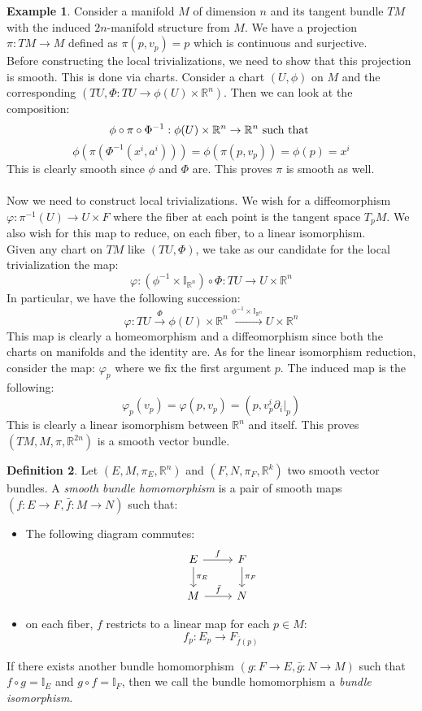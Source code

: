 \documentclass[12pt,a4paper]{report}
\theoremstyle{definition}
\newtheorem{Def}{Definition}[chapter]
\theoremstyle{Theorem}
\theoremstyle{definition}
\newtheorem{Ex}[Def]{Example}
\theoremstyle{definition}
\begin{document}
	\begin{Ex}
		Consider a manifold $M$ of dimension $n$ and its tangent bundle $TM$ with the induced $2n$-manifold structure from $M$. We have a projection $\pi:TM\rightarrow M$ defined as $\pi(p,v_p)=p$ which is continuous and surjective. 
		\\
		Before constructing the local trivializations, we need to show that this projection is smooth. This is done via charts. Consider a chart $(U,\phi)$ on $M$ and the corresponding $(TU,\Phi:TU\rightarrow \phi(U)\times \mathbb{R}^n)$. Then we can look at the composition:
		$$\phi\circ \pi\circ \Phi^{-1}:\phi(U)\times \mathbb{R}^n\rightarrow \mathbb{R}^n \hbox{ such that }$$ 
		$$\phi(\pi(\Phi^{-1}(x^i,a^i)))=\phi(\pi(p,v_p))=\phi(p)=x^i$$
		This is clearly smooth since $\phi$ and $\Phi$ are. This proves $\pi$ is smooth as well.\\
		\\
		Now we need to construct local trivializations. We wish for a diffeomorphism $\varphi:\pi^{-1}(U)\rightarrow U\times F$ where the fiber at each point is the tangent space $T_pM$. We also wish for this map to reduce, on each fiber, to a linear isomorphism.\\
		Given any chart on $TM$ like $(TU,\Phi)$, we take as our candidate for the local trivialization the map: 
		$$\varphi:(\phi^{-1}\times \mathbb{I}_{\mathbb{R}^n})\circ \Phi:TU\rightarrow U\times \mathbb{R}^n$$
		In particular, we have the following succession:
		$$\varphi:TU\xrightarrow{\text{$\Phi$}} \phi(U)\times \mathbb{R}^n\xrightarrow{\text{$\phi^{-1}\times \mathbb{I}_{\mathbb{R}^n}$}}U\times \mathbb{R}^n$$
		This map is clearly a homeomorphism and a diffeomorphism since both the charts on manifolds and the identity are. As for the linear isomorphism reduction, consider the map:
		$\varphi_p$ where we fix the first argument $p$. The induced map is the following:
		$$\varphi_p(v_p)=\varphi(p,v_p)=(p,v^i_p\partial_i|_p)$$
		This is clearly a linear isomorphism between $\mathbb{R}^n$ and itself. This proves $(TM,M,\pi,\mathbb{R}^{2n})$ is a smooth vector bundle.
	\end{Ex}
	\begin{Def}
		Let $(E,M,\pi_E,\mathbb{R}^n)$ and $(F,N,\pi_F,\mathbb{R}^k)$ two smooth vector bundles. A \textit{smooth bundle homomorphism} is a pair of smooth maps $(f:E\rightarrow F,\bar{f}:M\rightarrow N)$ such that:
		\begin{itemize}
			\item The following diagram commutes:
			\[
			\begin{tikzcd}
				E \arrow{r}{f} \arrow{d}{\pi_E} & F \arrow{d}{\pi_F}\\
				M \arrow{r}{\bar{f}}&N 
			\end{tikzcd}
			\]
			\item on each fiber, $f$ restricts to a linear map for each $p\in M$:
			$$f_p:E_p\rightarrow
			F_{\bar{f}(p)}$$
		\end{itemize} 
		If there exists another bundle homomorphism $(g:F\rightarrow E,\bar{g}:N\rightarrow M)$ such that
		$f\circ g=\mathbb{I}_E$ and $g\circ f=\mathbb{I}_F$, then we call the bundle homomorphism a \textit{bundle isomorphism}.
	\end{Def}
\end{document}
